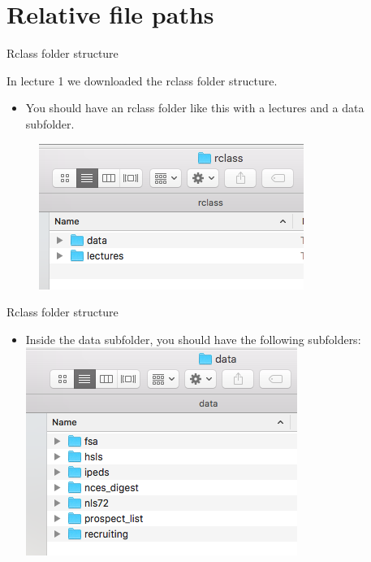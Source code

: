 \documentclass[8pt,ignorenonframetext,dvipsnames]{beamer}
\providecommand{\tightlist}{%
  \setlength{\itemsep}{0pt}\setlength{\parskip}{0pt}}
\let\olditem\item
\renewcommand{\item}{%
  \olditem\vspace{4pt}
}
\begin{document}
\section{Relative file paths}\label{relative-file-paths}

\begin{frame}{Rclass folder structure}

In lecture 1 we downloaded the rclass folder structure.

\begin{itemize}
\tightlist
\item
  You should have an rclass folder like this with a lectures and a data
  subfolder.
\end{itemize}

\begin{figure}
\centering
\includegraphics{rclass_folder.png}
\caption{}
\end{figure}

\end{frame}

\begin{frame}{Rclass folder structure}

\begin{itemize}
\tightlist
\item
  Inside the data subfolder, you should have the following subfolders:\\
  \includegraphics{rclass_folder_contents.png}
\end{itemize}

\end{frame}
\end{document}
